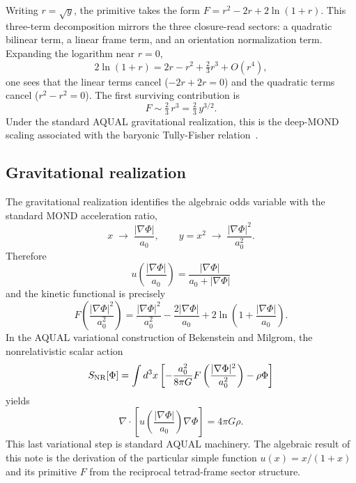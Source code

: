 \documentclass[10pt]{article}
\begin{document}
Writing $r=\sqrt y$, the primitive takes the form $F=r^2-2r+2\ln(1+r)$.
This three-term decomposition mirrors the three closure-read sectors: a
quadratic bilinear term, a linear frame term, and an orientation
normalization term.  Expanding the logarithm near $r=0$,
\[
        2\ln(1+r)=2r-r^2+\tfrac23 r^3+O(r^4),
\]
one sees that the linear terms cancel ($-2r+2r=0$) and the quadratic terms
cancel ($r^2-r^2=0$).  The first surviving contribution is
\[
        F\sim\tfrac23\,r^3=\tfrac23\,y^{3/2}.
\]
Under the standard AQUAL gravitational realization, this is the deep-MOND
scaling associated with the baryonic Tully-Fisher relation~\cite{Milgrom1983,FamaeyMcGaugh2012}.

\subsection{Gravitational realization}
The gravitational realization identifies the algebraic odds variable with the
standard MOND acceleration ratio,
\[
        x\;\longrightarrow\;\frac{|\nabla\Phi|}{a_0},
        \qquad
        y=x^2\;\longrightarrow\;\frac{|\nabla\Phi|^2}{a_0^2}.
\]
Therefore
\[
        u\!\left(\frac{|\nabla\Phi|}{a_0}\right)=\frac{|\nabla\Phi|}{a_0+|\nabla\Phi|}
\]
and the kinetic functional is precisely
\[
        F\!\left(\frac{|\nabla\Phi|^2}{a_0^2}\right)
        =\frac{|\nabla\Phi|^2}{a_0^2}
        -\frac{2|\nabla\Phi|}{a_0}
        +2\ln\!\left(1+\frac{|\nabla\Phi|}{a_0}\right).
\]
In the AQUAL variational construction of Bekenstein and Milgrom, the
nonrelativistic scalar action
\[
        S_{\rm NR}[\Phi]=\int d^3x\left[-\frac{a_0^2}{8\pi G}F\left(\frac{|\nabla\Phi|^2}{a_0^2}\right)-\rho\Phi\right]
\]
yields
\[
        \nabla\cdot\left[u\left(\frac{|\nabla\Phi|}{a_0}\right)\nabla\Phi\right]
        =4\pi G\rho.
\]
This last variational step is standard AQUAL machinery.  The algebraic result of
this note is the derivation of the particular simple function $u(x)=x/(1+x)$ and
its primitive $F$ from the reciprocal tetrad-frame sector structure.
\end{document}
